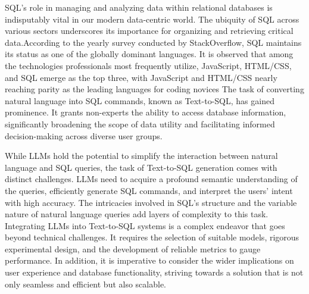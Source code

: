 \documentclass[a4paper,oneside]{book}
\begin{document}
SQL's role in managing and analyzing data within relational databases is indisputably vital in our modern data-centric world. The ubiquity of SQL across various sectors underscores its importance for organizing and retrieving critical data.According to the yearly survey conducted by StackOverflow, SQL maintains its status as one of the globally dominant languages. It is observed that among the technologies professionals most frequently utilize, JavaScript, HTML/CSS, and SQL emerge as the top three, with JavaScript and HTML/CSS nearly reaching parity as the leading languages for coding novices
The task of converting natural language into SQL commands, known as Text-to-SQL, has gained prominence. It grants non-experts the ability to access database information, significantly broadening the scope of data utility and facilitating informed decision-making across diverse user groups.

While LLMs hold the potential to simplify the interaction between natural language and SQL queries, the task of Text-to-SQL generation comes with distinct challenges. LLMs need to acquire a profound semantic understanding of the queries, efficiently generate SQL commands, and interpret the users' intent with high accuracy. The intricacies involved in SQL's structure and the variable nature of natural language queries add layers of complexity to this task. Integrating LLMs into Text-to-SQL systems is a complex endeavor that goes beyond technical challenges. It requires the selection of suitable models, rigorous experimental design, and the development of reliable metrics to gauge performance. In addition, it is imperative to consider the wider implications on user experience and database functionality, striving towards a solution that is not only seamless and efficient but also scalable.
\end{document}
